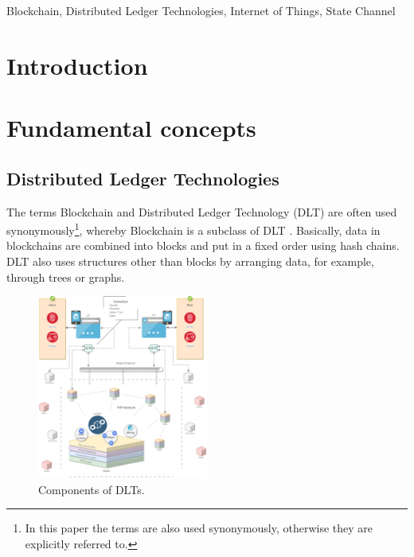 \documentclass[conference]{IEEEtran}
\begin{document}
\begin{IEEEkeywords}
Blockchain, Distributed Ledger Technologies, Internet of Things, State Channel
\end{IEEEkeywords}



\section{Introduction}
\lipsum[1-1]


\section{Fundamental concepts}
\subsection{Distributed Ledger Technologies}
The terms Blockchain and Distributed Ledger Technology (DLT) are often used synonymously\footnote{In this paper the terms are also used synonymously, otherwise they are explicitly referred to.}, whereby Blockchain is a subclass of DLT \cite{mastering2017}. Basically, data in blockchains are combined into blocks and put in a fixed order using hash chains. DLT also uses structures other than blocks by arranging data, for example, through trees or graphs.\\

\begin{figure}[htbp]
\centerline{\includegraphics[width=0.5\textwidth]{Overview-DLT.png}}
\caption{Components of DLTs.}
\label{fig:overview-dlt}
\end{figure}
\end{document}
